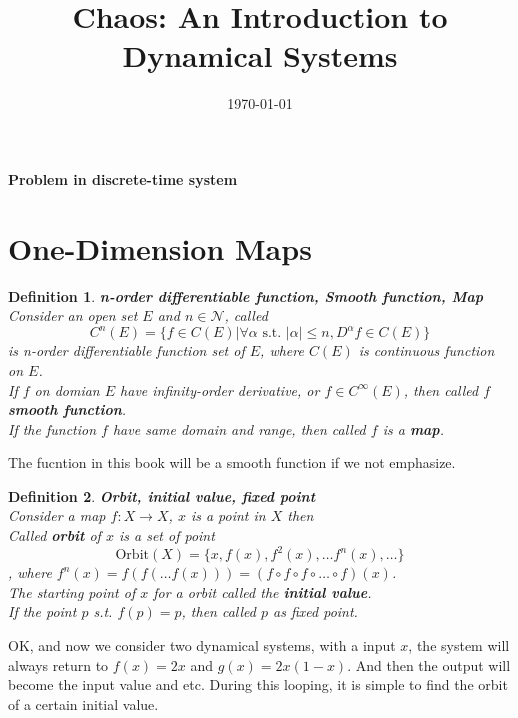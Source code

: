 \documentclass[12pt]{article}
\title{Chaos: An Introduction to Dynamical Systems}
\author{}
\date{\today}
\theoremstyle{plain}
\newtheorem{definition}{\textbf{Definition}}[section]
\begin{document}
\tableofcontents
\newpage
\setcounter{page}{1}

\maketitle


{
\begin{center}
\LARGE \textbf{Problem in discrete-time system}
\end{center}
}
\section{One-Dimension Maps}

\begin{definition}\textbf{n-order differentiable function, Smooth function, Map}
\\\noindent Consider an open set $E$ and $n \in \mathcal N$, called 
$$
C^n(E) = \{f \in C(E) | \forall \alpha \text{ s.t. } |\alpha| \leq n, D^\alpha f \in C(E)\}
$$
is n-order differentiable function set of $E$, where $C(E)$ is continuous function on $E$.
\\\noindent If $f$ on domian $E$ have infinity-order derivative, or $f \in C^\infty(E)$, then called $f$ \textbf{smooth function}.
\\\noindent If the function $f$ have same domain and range, then called $f$ is a \textbf{map}.
\end{definition}

{\color{red} The fucntion in this book will be a smooth function if we not emphasize.}

\begin{definition}\textbf{Orbit, initial value, fixed point}
\\\noindent Consider a map $f: X \rightarrow X$, $x$ is a point in $X$ then 
\\\noindent Called \textbf{orbit} of $x$ is a set of point 
$$
\text{Orbit}(X) = \{x, f(x), f^2(x), \ldots f^n(x), \ldots\}
$$
, where $f^n(x) = f(f(\ldots f(x))) = (f\circ f \circ f \circ \ldots \circ f)(x)$.
\\\noindent The starting point of $x$ for a orbit called the \textbf{initial value}.
\\\noindent If the point $p$ s.t. $f(p) = p$, then called $p$ as fixed point.
\end{definition}

OK, and now we consider two dynamical systems, with a input $x$, the system will always return to $f(x) = 2x$ and $g(x) = 2x(1-x)$. And then the output will become the input value and etc. During this looping, it is simple to find the orbit of a certain initial value.
\end{document}
